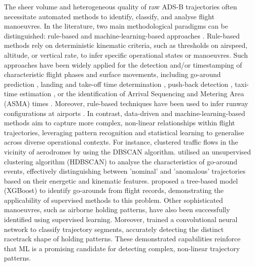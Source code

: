 \documentclass[
  manuscript=proceedings,  %
  layout=preprint,         %
  year=2025,
  volume=x,
]{extra/joas}
\begin{document}
The sheer volume and heterogeneous quality of raw ADS-B trajectories often necessitate automated methods to identify, classify, and analyse flight manoeuvres. In the literature, two main methodological paradigms can be distinguished: rule-based and machine-learning-based approaches \cite{Olive_etal_2020}. Rule-based methods rely on deterministic kinematic criteria, such as thresholds on airspeed, altitude, or vertical rate, to infer specific operational states or manoeuvres. Such approaches have been widely applied for the detection and/or timestamping of characteristic flight phases and surface movements, including go-around prediction \cite{Figuet_etal_2020, Figuet_etal_2023}, landing and take-off time determination \cite{Waltert_Figuet_2023}, push-back detection \cite{Waltert_etal_2024}, taxi-time estimation \cite{Waltert_etal_2024, Olive_etal_2025}, or the identification of Arrival Sequencing and Metering Area (ASMA) times \cite{Figuet_etal_2023}. Moreover, rule-based techniques have been used to infer runway configurations at airports \cite{Torres_etal_2019}. In contrast, data-driven and machine-learning-based methods aim to capture more complex, non-linear relationships within flight trajectories, leveraging pattern recognition and statistical learning to generalise across diverse operational contexts. For instance, \textcite{Olive_Morio_2019} clustered traffic flows in the vicinity of aerodromes by using the DBSCAN algorithm. \textcite{kumar_classification_2021} utilised an unsupervised clustering algorithm (HDBSCAN) to analyse the characteristics of go-around events, effectively distinguishing between 'nominal' and 'anomalous' trajectories based on their energetic and kinematic features. \textcite{dhief_tree_based_2021} proposed a tree-based model (XGBoost) to identify go-arounds from flight records, demonstrating the applicability of supervised methods to this problem. Other sophisticated manoeuvres, such as airborne holding patterns, have also been successfully identified using supervised learning. Moreover, \textcite{olive_holding_patterns} trained a convolutional neural network to classify trajectory segments, accurately detecting the distinct racetrack shape of holding patterns. These demonstrated capabilities reinforce that ML is a promising candidate for detecting complex, non-linear trajectory patterns.
\end{document}
